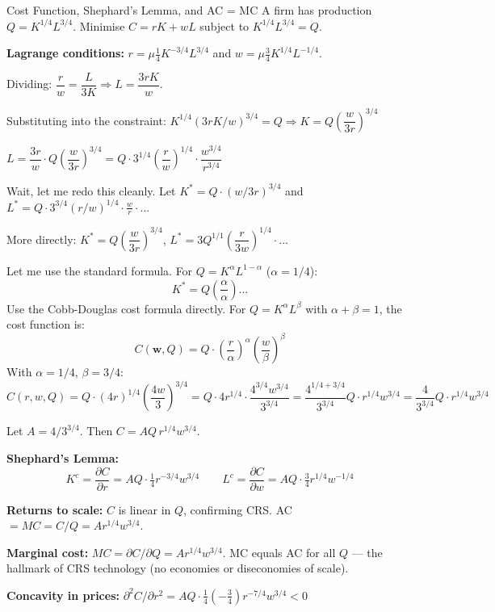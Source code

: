 \documentclass[12pt, a4paper]{article}
\theoremstyle{definition}
\newcommand{\pp}[2]{\dfrac{\partial #1}{\partial #2}}
\begin{document}
\begin{exbox}{Cost Function, Shephard's Lemma, and AC = MC}
A firm has production $Q = K^{1/4}L^{3/4}$.
Minimise $C = rK + wL$ subject to $K^{1/4}L^{3/4} = Q$.

\textbf{Lagrange conditions:}
$r = \mu\frac{1}{4}K^{-3/4}L^{3/4}$ and $w = \mu\frac{3}{4}K^{1/4}L^{-1/4}$.

Dividing: $\dfrac{r}{w} = \dfrac{L}{3K} \Rightarrow L = \dfrac{3rK}{w}$.

Substituting into the constraint:
$K^{1/4}(3rK/w)^{3/4} = Q \Rightarrow K = Q\left(\dfrac{w}{3r}\right)^{3/4}$

$L = \dfrac{3r}{w}\cdot Q\left(\dfrac{w}{3r}\right)^{3/4}
   = Q\cdot 3^{1/4}\left(\dfrac{r}{w}\right)^{1/4}\cdot\dfrac{w^{3/4}}{r^{3/4}}$

Wait, let me redo this cleanly. Let $K^* = Q\cdot(w/3r)^{3/4}$ and
$L^* = Q\cdot 3^{3/4}(r/w)^{1/4}\cdot\frac{w}{r}\cdot...$

More directly: $K^* = Q\left(\dfrac{w}{3r}\right)^{3/4}$,
$L^* = 3Q^{1/1}\left(\dfrac{r}{3w}\right)^{1/4}\cdot...$

Let me use the standard formula. For $Q=K^\alpha L^{1-\alpha}$ ($\alpha=1/4$):
\[
  K^* = Q\left(\frac{\alpha}{\alpha}\right)...
\]
Use the Cobb-Douglas cost formula directly.
For $Q = K^\alpha L^\beta$ with $\alpha+\beta=1$, the cost function is:
\[
  C(\mathbf{w},Q) = Q\cdot\left(\frac{r}{\alpha}\right)^\alpha
                   \left(\frac{w}{\beta}\right)^\beta
\]
With $\alpha=1/4$, $\beta=3/4$:
\[
  C(r,w,Q) = Q\cdot(4r)^{1/4}\left(\frac{4w}{3}\right)^{3/4}
            = Q\cdot 4r^{1/4}\cdot\frac{4^{3/4}w^{3/4}}{3^{3/4}}
            = \frac{4^{1/4+3/4}}{3^{3/4}}Q\cdot r^{1/4}w^{3/4}
            = \frac{4}{3^{3/4}}Q\cdot r^{1/4}w^{3/4}
\]

Let $A = 4/3^{3/4}$. Then $C = AQ\,r^{1/4}w^{3/4}$.

\textbf{Shephard's Lemma:}
\[
  K^c = \pp{C}{r} = AQ\cdot\tfrac{1}{4}r^{-3/4}w^{3/4}
  \qquad
  L^c = \pp{C}{w} = AQ\cdot\tfrac{3}{4}r^{1/4}w^{-1/4}
\]

\textbf{Returns to scale:} $C$ is linear in $Q$, confirming CRS.
AC $= MC = C/Q = A r^{1/4}w^{3/4}$.

\textbf{Marginal cost:} $MC = \partial C/\partial Q = Ar^{1/4}w^{3/4}$.
MC equals AC for all $Q$ --- the hallmark of CRS technology (no economies or diseconomies of scale).

\textbf{Concavity in prices:}
$\partial^2 C/\partial r^2 = AQ\cdot\tfrac{1}{4}(-\tfrac{3}{4})r^{-7/4}w^{3/4} < 0$ \checkmark
\end{exbox}
\end{document}
